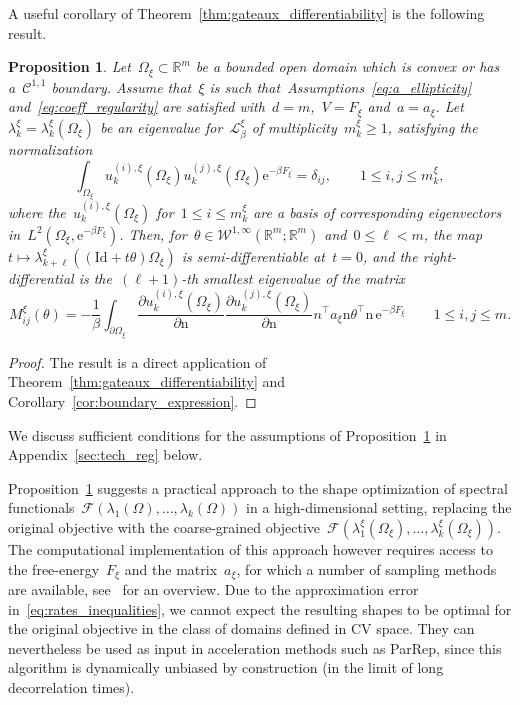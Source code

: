 \documentclass[a4]{article}
\newcommand{\cL}{\mathcal{L}}
\newcommand{\e}{\mathrm{e}}
\newcommand{\R}{\mathbb{R}}
\newcommand{\n}{\mathrm{n}}
\newcommand{\1}{\mathbbm 1}
\newcommand{\Winf}{{{\cW}^{1,\infty}}}
\newcommand{\Id}{\mathrm{Id}}
\newcommand{\cW}{\mathcal{W}}
\newtheorem{proposition}{Proposition}
\begin{document}
    A useful corollary of Theorem~\ref{thm:gateaux_differentiability} is the following result.
    \begin{proposition}
        \label{prop:directional_derivative_xi}
        Let~$\Omega_\xi\subset\R^m$ be a bounded open domain which is convex or has a~$\mathcal C^{1,1}$ boundary.
        Assume that~$\xi$ is such that~Assumptions~\eqref{eq:a_ellipticity} and~\eqref{eq:coeff_regularity} are satisfied with~$d=m$,~$V=F_\xi$ and~$a=a_\xi$.
        Let~$\lambda_k^\xi=\lambda_k^\xi(\Omega_\xi)$ be an eigenvalue for~$\cL_\beta^\xi$ of multiplicity~$m_k^\xi\geq 1$, satisfying the normalization
        \[\int_{\Omega_\xi} u_k^{(i),\xi}(\Omega_\xi)u_k^{(j),\xi}(\Omega_\xi)\e^{-\beta F_\xi} = \delta_{ij},\qquad 1\leq i,j\leq m_k^\xi,\]
        where the~$u_k^{(i),\xi}(\Omega_\xi)$ for~$1\leq i\leq m_k^\xi$ are a basis of corresponding eigenvectors in~$L^2(\Omega_\xi,\e^{-\beta F_\xi})$.
        Then, for~$\theta\in \Winf(\R^m;\R^m)$ and~$0\leq \ell<m$, the map~$t\mapsto \lambda_{k+\ell}^{\xi}((\Id + t\theta)\Omega_\xi)$ is semi-differentiable at~$t=0$, and the right-differential is the~$(\ell+1)$-th smallest eigenvalue of the matrix
        \begin{equation}
        \label{eq:shape_derivative_xi}
        M_{ij}^{\xi}(\theta) = -\frac1\beta\int_{\partial \Omega_\xi}\frac{\partial u_k^{(i),\xi}(\Omega_\xi)}{\partial\n}\frac{\partial u_k^{(j),\xi}(\Omega_\xi)}{\partial\n} n^\top a_\xi\n\theta^\top\n\,\e^{-\beta F_\xi}\qquad 1\leq i,j\leq m.
        \end{equation}
    \end{proposition}
    \begin{proof}
        The result is a direct application of Theorem~\ref{thm:gateaux_differentiability} and Corollary~\ref{cor:boundary_expression}.
    \end{proof}
    We discuss sufficient conditions for the assumptions of Proposition~\ref{prop:directional_derivative_xi} in Appendix~\ref{sec:tech_reg} below.

    Proposition~\ref{prop:directional_derivative_xi} suggests a practical approach to the shape optimization of spectral functionals~$\mathcal F(\lambda_1(\Omega),\dots,\lambda_k(\Omega))$ in a high-dimensional setting, replacing the original objective with the coarse-grained objective~$\mathcal F(\lambda_1^\xi(\Omega_\xi),\dots,\lambda^\xi_k(\Omega_\xi))$.
    The computational implementation of this approach however requires access to the free-energy~$F_\xi$ and the matrix~$a_\xi$, for which a number of sampling methods are available, see~\cite{LRS10} for an overview.
    Due to the approximation error in~\eqref{eq:rates_inequalities}, we cannot expect the resulting shapes to be optimal for the original objective in the class of domains defined in CV space. They can nevertheless be used as input in acceleration methods such as ParRep, since this algorithm is dynamically unbiased by construction (in the limit of long decorrelation times).
\end{document}
